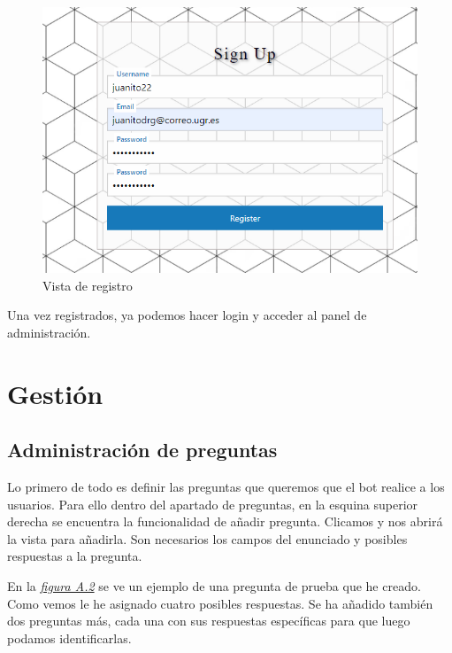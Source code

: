 \begin{figure}[!ht]
    \centering
    \includegraphics[width=1\textwidth]{imagenes/registro_a.png}
    \caption{ Vista de registro }
    \label{fig:vista-registro}
\end{figure}\vspace{0.5cm}

Una vez registrados, ya podemos hacer login y acceder al panel de administración.\vspace{0.5cm}

\section{Gestión}\vspace{0.5cm}

\subsection{Administración de preguntas}\vspace{0.5cm}

Lo primero de todo es definir las preguntas que queremos que el bot realice a los usuarios. Para ello dentro del apartado de preguntas, en la esquina superior derecha se encuentra la funcionalidad de añadir pregunta. Clicamos y nos abrirá la vista para añadirla. Son necesarios los campos del enunciado y posibles respuestas a la pregunta. 

En la \textit{\hyperref[fig:creacion_pregunta]{figura A.2}} se ve un ejemplo de una pregunta de prueba que he creado. Como vemos le he asignado cuatro posibles respuestas. Se ha añadido también dos preguntas más, cada una con sus respuestas específicas para que luego podamos identificarlas.
\vspace{0.5cm}


